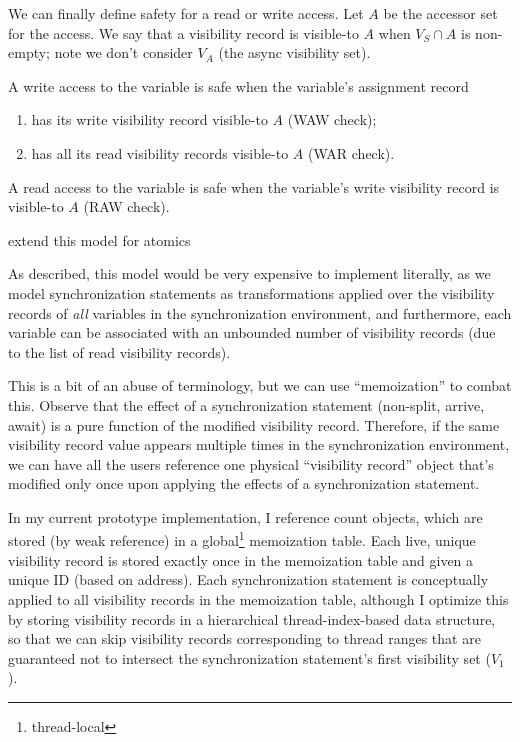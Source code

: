 \filbreak
{} We can finally define safety for a read or write access.
Let $A$ be the accessor set for the access.
We say that a visibility record is visible-to $A$ when ${V_S \cap A}$ is non-empty; note we don't consider $V_A$ (the async visibility set).

A write access to the variable is safe when the variable's assignment record
\begin{enumerate}
  \item has its write visibility record visible-to $A$ (WAW check);
  \item has all its read visibility records visible-to $A$ (WAR check).
\end{enumerate}
A read access to the variable is safe when the variable's write visibility record is visible-to $A$ (RAW check).

 extend this model for atomics

\filbreak
{}

 As described, this model would be very expensive to implement literally, as we model synchronization statements as transformations applied over the visibility records of \textit{all} variables in the synchronization environment, and furthermore, each variable can be associated with an unbounded number of visibility records (due to the list of read visibility records).

\filbreak
This is a bit of an abuse of terminology, but we can use ``memoization'' to combat this.
Observe that the effect of a synchronization statement (non-split, arrive, await) is a pure function of the modified visibility record.
Therefore, if the same visibility record value appears multiple times in the synchronization environment, we can have all the users reference one physical ``visibility record'' object that's modified only once upon applying the effects of a synchronization statement.

\filbreak
In my current prototype implementation, I reference count  objects, which are stored (by weak reference) in a global\footnote{thread-local} memoization table.
Each live, unique visibility record is stored exactly once in the memoization table and given a unique ID (based on address).
Each synchronization statement is conceptually applied to all visibility records in the memoization table, although I optimize this by storing visibility records in a hierarchical thread-index-based data structure, so that we can skip visibility records corresponding to thread ranges that are guaranteed not to intersect the synchronization statement's first visibility set ($V_1$).

